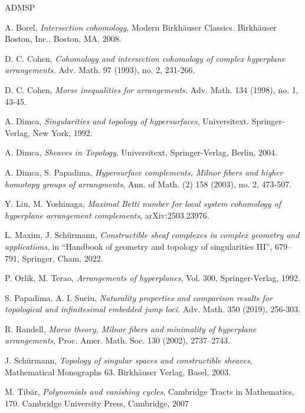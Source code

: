 \documentclass[12pt,leqno,twoside]{amsart}
\theoremstyle{plain}
\theoremstyle{definition}
\begin{document}
\begin{thebibliography}{ADMSP}


 A. Borel, {\it Intersection cohomology}, Modern Birkh\"auser Classics. Birkh\"auser Boston, Inc., Boston, MA, 2008.

 D. C. Cohen, {\it Cohomology and intersection cohomology of complex hyperplane arrangements.}  Adv. Math. 97 (1993), no. 2, 231-266.

 D. C. Cohen, {\it Morse inequalities for arrangements.} Adv. Math. 134 (1998), no. 1, 43-45.


 A. Dimca, {\it Singularities and topology of hypersurfaces}, Universitext. Springer-Verlag, New York, 1992.

 A. Dimca, {\it Sheaves in Topology},
Universitext, Springer-Verlag, Berlin, 2004.

 A. Dimca, S. Papadima, {\it Hypersurface complements, Milnor fibers and higher homotopy groups of arrangments}, Ann. of Math. (2) 158 (2003), no. 2, 473-507.


 Y. Liu,  M. Yoshinaga, {\it Maximal Betti number for local system cohomology of hyperplane arrangement complements}, arXiv:2503.23976.


 L. Maxim, J. Sch\"urmann, {\it Constructible sheaf complexes in complex geometry and applications}, in ``Handbook of geometry and topology of singularities III'', 679--791, Springer, Cham, 2022.

 P. Orlik, M. Terao, {\it Arrangements of hyperplanes}, Vol. 300, Springer-Verlag, 1992.


 S. Papadima, A. I. Suciu, {\it Naturality properties and comparison results for topological and infinitesimal embedded jump loci.} Adv. Math. 350 (2019), 256-303.

 R. Randell, {\it Morse theory, Milnor fibers and minimality of hyperplane arrangements},  Proc. Amer. Math. Soc. 130 (2002), 2737--2743.

 J. Sch\"urmann, {\it Topology of singular spaces and constructible sheaves}, Mathematical Monographs 63. Birkh\"auser Verlag, Basel, 2003.

 M. Tib\u{a}r, {\it Polynomials and vanishing cycles}, Cambridge Tracts in Mathematics, 170. Cambridge University Press, Cambridge, 2007

\end{thebibliography}
\end{document}
